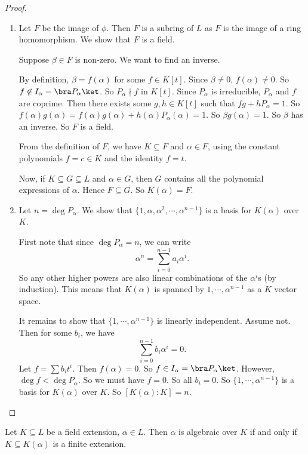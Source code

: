 \documentclass[a4paper]{article}
\begin{document}
\begin{proof}\leavevmode
  \begin{enumerate}
    \item Let $F$ be the image of $\phi$. Then $F$ is a subring of $L$ as $F$ is the image of a ring homomorphism. We show that $F$ is a field.

      Suppose $\beta\in F$ is non-zero. We want to find an inverse.

      By definition, $\beta = f(\alpha)$ for some $f\in K[t]$. Since $\beta \not= 0$, $f(\alpha) \not= 0$. So $f \not \in I_\alpha = \bra P_\alpha\ket$. So $P_\alpha \nmid f$ in $K[t]$. Since $P_\alpha$ is irreducible, $P_\alpha$ and $f$ are coprime. Then there exists some $g, h \in K[t]$ such that $fg + hP_\alpha = 1$. So $f(\alpha)g(\alpha) = f(\alpha) g(\alpha) + h(\alpha)P_\alpha(\alpha) = 1$. So $\beta g(\alpha) = 1$. So $\beta$ has an inverse. So $F$ is a field.

      From the definition of $F$, we have $K\subseteq F$ and $\alpha \in F$, using the constant polynomials $f = c \in K$ and the identity $f = t$.

      Now, if $K\subseteq G\subseteq L$ and $\alpha \in G$, then $G$ contains all the polynomial expressions of $\alpha$. Hence $F\subseteq G$. So $K(\alpha) = F$.
    \item Let $n = \deg P_\alpha$. We show that $\{1, \alpha, \alpha^2, \cdots, \alpha^{n - 1}\}$ is a basis for $K(\alpha)$ over $K$.

      First note that since $\deg P_\alpha = n$, we can write
      \[
        \alpha^n = \sum_{i = 0}^{n - 1} a_i \alpha^i.
      \]
      So any other higher powers are also linear combinations of the $\alpha^i$s (by induction). This means that $K(\alpha)$ is spanned by $1, \cdots, \alpha^{n - 1}$ as a $K$ vector space.

      It remains to show that $\{1, \cdots, \alpha^{n - 1}\}$ is linearly independent. Assume not. Then for some $b_i$, we have
      \[
        \sum_{i = 0}^{n - 1} b_i \alpha^i = 0.
      \]
      Let $f = \sum b_i t^i$. Then $f(\alpha) = 0$. So $f \in I_\alpha = \bra P_\alpha\ket$. However, $\deg f < \deg P_\alpha$. So we must have $f = 0$. So all $b_i = 0$. So $\{1, \cdots, \alpha^{n - 1}\}$ is a basis for $K(\alpha)$ over $K$. So $[K(\alpha): K] = n$.
  \end{enumerate}
\end{proof}

\begin{cor}
  Let $K\subseteq L$ be a field extension, $\alpha \in L$. Then $\alpha$ is algebraic over $K$ if and only if $K \subseteq K(\alpha)$ is a finite extension.
\end{cor}
\end{document}

